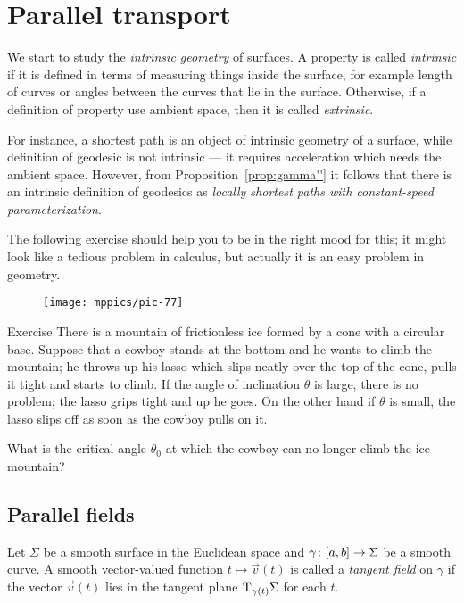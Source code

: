 \chapter{Parallel transport}

We start to study the \emph{intrinsic geometry} of surfaces.
A property is called \emph{intrinsic} if it is defined in terms of measuring things inside the surface, for example length of curves or angles between the curves that lie in the surface.
Otherwise, if a definition of property use ambient space, then it is called \emph{extrinsic}.

For instance, a shortest path is an object of intrinsic geometry of a surface,
while definition of geodesic is not intrinsic --- it requires acceleration which needs the ambient space.
However, from Proposition~\ref{prop:gamma''} it follows that there is an intrinsic definition of geodesics as \emph{locally shortest paths with constant-speed parameterization}.  

The following exercise should help you to be in the right mood for this;
it might look like a tedious problem in calculus, but actually it is an easy problem in geometry.

\begin{wrapfigure}{r}{33 mm}
\vskip-0mm
\centering
\texttt{[image: mppics/pic-77]}
\vskip-0mm
\end{wrapfigure}

\begin{thm}{Exercise}\label{ex:lasso}
There is a mountain of frictionless ice formed by a cone with a circular base.
Suppose that a cowboy stands at the bottom and he wants to climb the mountain;
he throws up his lasso which slips neatly over the top of the cone, pulls it tight and starts to climb.
If the angle of inclination $\theta$ is large, there is no problem; the lasso grips tight and up he goes.
On the other hand if $\theta$ is small, the lasso slips off as soon as the cowboy pulls on it.

What is the critical angle $\theta_0$ at which the cowboy can no longer climb the ice-mountain?
\end{thm}


\section*{Parallel fields}

Let $\Sigma$ be a smooth surface in the Euclidean space and $\gamma\:[a,b]\z\to \Sigma$ be a smooth curve.
A smooth vector-valued function $t\mapsto {\vec v}(t)$ is called a \emph{tangent field} on $\gamma$ if
the vector ${\vec v}(t)$ lies in the tangent plane $\mathrm{T}_{\gamma(t)}\Sigma$ for each $t$.

